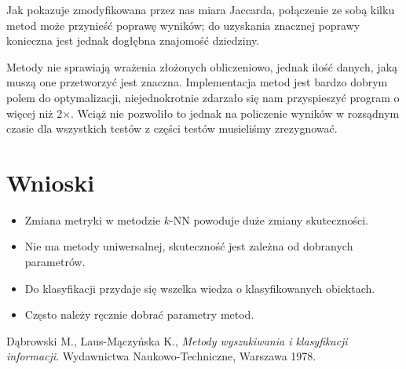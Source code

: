 \documentclass{classrep}
\begin{document}
Jak pokazuje zmodyfikowana przez nas miara Jaccarda, połączenie ze sobą kilku metod może przynieść poprawę wyników; do uzyskania znacznej poprawy konieczna jest jednak dogłębna znajomość dziedziny.

Metody nie sprawiają wrażenia złożonych obliczeniowo, jednak ilość danych, jaką muszą one przetworzyć jest znaczna. Implementacja metod jest bardzo dobrym polem do optymalizacji, niejednokrotnie zdarzało się nam przyspieszyć program o więcej niż 2$\times$. Wciąż nie pozwoliło to jednak na policzenie wyników w rozsądnym czasie dla wszystkich testów \ppauza z części testów musieliśmy zrezygnować.

\section{Wnioski}
\begin{itemize}
 \item Zmiana metryki w metodzie $k$-NN powoduje duże zmiany skuteczności.
 \item Nie ma metody uniwersalnej, skuteczność jest zależna od dobranych parametrów.
 \item Do klasyfikacji przydaje się wszelka wiedza o klasyfikowanych obiektach.
 \item Często należy ręcznie dobrać parametry metod.
\end{itemize}

\begin{thebibliography}{0}
Dąbrowski M., Laus-Mączyńska K., \textit{Metody wyszukiwania i klasyfikacji informacji}.
Wydawnictwa Naukowo-Techniczne, Warszawa 1978.
\end{thebibliography}
\end{document}
